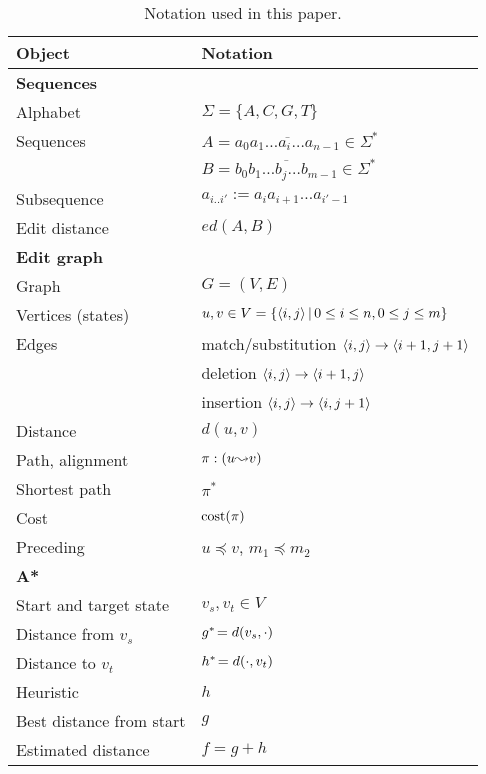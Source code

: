 \newcommand*{\tabindent}{\hspace{3mm}}
\begin{table}[h]
  \centering
  \caption{Notation used in this paper.}
  \begin{tabular}{ll}
	\hline
	\textbf{Object}	         & \textbf{Notation}\\
	\hline
	\textbf{Sequences}  & \\
	\tabindent Alphabet            	& $\Sigma = \{A,C,G,T\}$ \\
	\tabindent Sequences            &
									  $A = \overline{a_0a_1 \dots a_i \dots a_{n-1}}\in \Sigma^*$\\
							 & $B = \overline{b_0b_1 \dots b_j \dots b_{m-1}} \in \Sigma^*$ \\
	\tabindent Subsequence          & $a_{i..i'} := a_ia_{i+1}\dots a_{i'-1}$\\
	\tabindent Edit distance        & $ed(A,B)$\\
	\hline
	\textbf{Edit graph} & \\
	\tabindent Graph& $G=(V,E)$\\
	\tabindent Vertices (states) & $u,v \in V=\{\langle i, j \rangle\, |\, 0\leq i\leq n, 0\leq j
								   \leq m\}$\\
	\tabindent Edges& match/substitution $\langle i, j \rangle \to \langle i+1, j+1 \rangle$\\
							 & deletion $\langle i, j \rangle \to \langle i+1, j \rangle$\\
							 & insertion $\langle i, j \rangle \to \langle i, j+1 \rangle$\\
	\tabindent Distance & $d(u, v)$\\
	\tabindent Path, alignment & $\pi: (u{\leadsto}v)$\\
	\tabindent Shortest path & $\pi^*$\\
	\tabindent Cost & $\operatorname{cost}(\pi)$\\
	\tabindent Preceding & $u \preceq v$, $m_1\preceq m_2$ \\
	\hline
	\textbf{A*} & \\
	\tabindent Start and target state& $v_s, v_t \in V$\\
	\tabindent Distance from $v_s$ & $g^*\! = d(v_s, \cdot)$\\
	\tabindent Distance to $v_t$& $h^*\! = d(\cdot, v_t)$\\
	\tabindent Heuristic & $h$\\
	\tabindent Best distance from start & $g$  \\
	\tabindent Estimated distance & $f = g + h$\\

\end{tabular}
\end{table}
